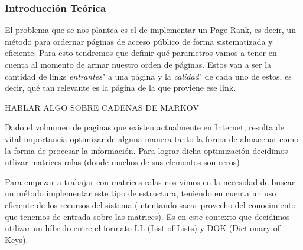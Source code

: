\subsubsection*{Introducción Teórica}

\par El problema que se nos plantea es el de implementar un Page Rank, es decir, un método para ordernar páginas de acceso público de forma sistematizada y eficiente. 
Para esto tendremos que definir qu\'e parametros vamos a tener en cuenta al momento de armar nuestro orden de páginas.
Estos van a ser la cantidad de links \textit{entrantes}" a una página y la \textit{calidad}" de cada uno de estos, es decir, qu\'e tan relevante es la página de la que proviene ese link.\newline


\par HABLAR ALGO SOBRE CADENAS DE MARKOV

\par Dado el volmunen de paginas que existen actualmente en Internet, resulta de vital importancia optimizar de alguna manera tanto la forma de almacenar
como la forma de procesar la informaci\'on. Para lograr dicha optimizaci\'on decidimos utlizar matrices ralas (donde muchos de sus elementos son ceros)
\par Para empezar a trabajar con matrices ralas nos vimos en la necesidad de buscar un método implementar este tipo de estructura,
teniendo en cuenta un uso eficiente de los recursos del sistema (intentando sacar provecho del conocimiento que tenemos de entrada sobre las matrices). 
Es en este contexto que decidimos utilizar un h\'ibrido entre el formato LL (List of Lists) y DOK (Dictionary of Keys).\newline
